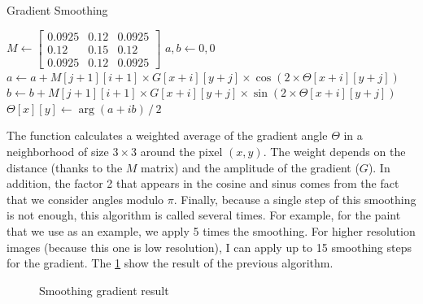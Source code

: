 \documentclass[11pt]{article}
\begin{document}
	\begin{algorithm}[h]
		\caption{Gradient Smoothing}
		\label{alg:gsmooth}
		\begin{algorithmic}
			\State $M \gets \begin{bmatrix}
				0.0925 & 0.12 & 0.0925 \\
				0.12 & 0.15 & 0.12 \\
				0.0925 & 0.12 & 0.0925
			\end{bmatrix}$
			\State $a, b \gets 0, 0$
				\State $a \gets a + M[j+1][i+1] \times G[x+i][y+j] \times \cos \left( 2 \times \Theta[x+i][y+j] \right)$
				\State $b \gets b + M[j+1][i+1] \times G[x+i][y+j] \times \sin \left( 2 \times \Theta[x+i][y+j] \right)$
			\EndFor
			\State $\Theta[x][y] \gets \arg \left( a + ib \right) \, / \, 2$
			\EndFunction
		\end{algorithmic}
	\end{algorithm}

	The function calculates a weighted average of the gradient angle $\Theta$ in a neighborhood of size $3 \times 3$ around the pixel $(x, y)$. The weight depends on the distance (thanks to the $M$ matrix) and the amplitude of the gradient ($G$). In addition, the factor 2 that appears in the cosine and sinus comes from the fact that we consider angles modulo $\pi$. Finally, because a single step of this smoothing is not enough, this algorithm is called several times. For example, for the paint that we use as an example, we apply 5 times the smoothing. For higher resolution images (because this one is low resolution), I can apply up to 15 smoothing steps for the gradient. The \figurename \ref{im:gsmooth} show the result of the previous algorithm.
	
	\begin{figure}[h]
		\centering
		\vspace{-1mm}
		\caption{Smoothing gradient result}
		\label{im:gsmooth}
	\end{figure}
\end{document}

